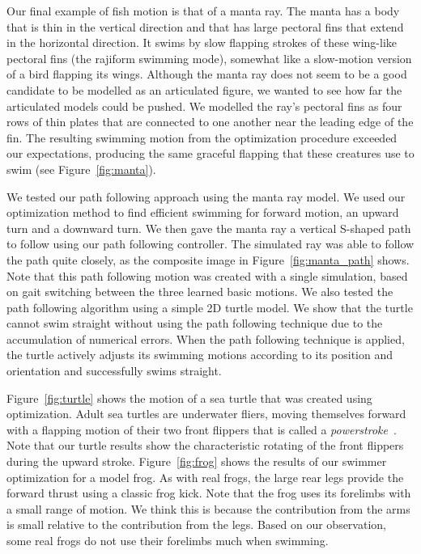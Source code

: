 Our final example of fish motion is that of a manta ray.  The manta has a
body that is thin in the vertical direction and that has large pectoral fins
that extend in the horizontal direction.  It swims by slow flapping strokes
of these wing-like pectoral fins (the rajiform swimming mode), somewhat like
a slow-motion version of a bird flapping its wings.  Although the manta ray
does not seem to be a good candidate to be modelled as an articulated
figure, we wanted to see how far the articulated models could be pushed.  We
modelled the ray's pectoral fins as four rows of thin plates that are
connected to one another near the leading edge of the fin.  The resulting
swimming motion from the optimization procedure exceeded our expectations,
producing the same graceful flapping that these creatures use to swim (see
Figure~\ref{fig:manta}).

We tested our path following approach using the manta ray model.  We used
our optimization method to find efficient swimming for forward motion, an
upward turn and a downward turn.  We then gave the manta ray a vertical
S-shaped path to follow using our path following controller.  The
simulated ray was able to follow the path quite closely, as the composite
image in Figure~\ref{fig:manta_path} shows.  Note that this path following
motion was created with a single simulation, based on gait switching
between the three learned basic motions. We also tested the path following
algorithm using a simple 2D turtle model. We show that the turtle cannot
swim straight without using the path following technique due to the
accumulation of numerical errors. When the path following technique is
applied, the turtle actively adjusts its swimming motions according to its
position and orientation and successfully swims straight.

Figure~\ref{fig:turtle} shows the motion of a sea turtle that was created
using optimization.  Adult sea turtles are underwater fliers, moving
themselves forward with a flapping motion of their two front flippers that
is called a \emph{powerstroke}~\cite{wyneken1997}.  Note that our turtle
results show the characteristic rotating of the front flippers during the
upward stroke.  Figure~\ref{fig:frog} shows the results of our swimmer
optimization for a model frog.  As with real frogs, the large rear legs
provide the forward thrust using a classic frog kick. Note that the frog uses its forelimbs with a small range of motion. We think this is because the contribution from the arms is small relative to the contribution from the legs. Based on our observation, some real frogs do not use their forelimbs much when swimming.

